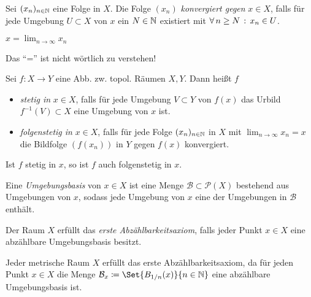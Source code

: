 \documentclass{cheat-sheet}
\begin{document}

\begin{defn}
  Sei $(x_n)_{n \in \mathbb{N}}$ eine Folge in $X$. Die Folge $(x_n)$ \emph{konvergiert gegen} $x \in X$, falls für jede Umgebung $U \subset X$ von $x$ ein $N \in \mathbb{N}$ existiert mit $\forall \, {n \geq N} \,:\, x_n \in U$.
\end{defn}

\begin{nota}
  $x = \lim_{n \to \infty} x_n$
\end{nota}

\begin{acht}
  Das "`="' ist nicht wörtlich zu verstehen!
\end{acht}

\begin{defn}
  Sei $f : X {\to} Y$ eine Abb. zw. topol. Räumen $X, Y$. Dann heißt $f$
  \begin{itemize}
    \item \emph{stetig in} $x \in X$, falls für jede Umgebung $V \subset Y$ von $f(x)$ das Urbild $f^{-1}(V) \subset X$ eine Umgebung von $x$ ist.
    \item \emph{folgenstetig in} $x \in X$, falls für jede Folge $(x_n)_{n \in \mathbb{N}}$ in $X$ mit $\lim_{n\to\infty} x_n = x$ die Bildfolge $(f(x_n))$ in $Y$ gegen $f(x)$ konvergiert.
  \end{itemize}
\end{defn}

\begin{prop}
  Ist $f$ stetig in $x$, so ist $f$ auch folgenstetig in $x$.
\end{prop}

\begin{defn}
  Eine \emph{Umgebungsbasis} von $x \in X$ ist eine Menge $\mathcal{B} \subset \mathcal{P}(X)$ bestehend aus Umgebungen von $x$, sodass jede Umgebung von $x$ eine der Umgebungen in $\mathcal{B}$ enthält.
\end{defn}

\begin{defn}
  Der Raum $X$ erfüllt das \emph{erste Abzählbarkeitsaxiom}, falls jeder Punkt $x \in X$ eine abzählbare Umgebungsbasis besitzt.
\end{defn}

\begin{bem}
  Jeder metrische Raum $X$ erfüllt das erste Abzählbarkeitsaxiom, da für jeden Punkt $x \in X$ die Menge $\mathcal{B}_x \coloneqq \Set{B_{1/n}(x)}{n\in\N}$ eine abzählbare Umgebungsbasis ist.
\end{bem}
\end{document}
